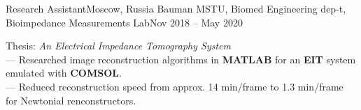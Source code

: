 \resumeSubheading
{Research Assistant}{Moscow, Russia}
{Bauman MSTU, Biomed Engineering dep-t, Bioimpedance Measurements Lab}{Nov 2018 -- May 2020}
\begin{itemize}[leftmargin=0in, label={}]
    \small{\item{
        {Thesis: \textit{An Electrical Impedance Tomography System}}\\
        {— Researched image reconstruction algorithms in \textbf{MATLAB} for an \textbf{EIT} system emulated with \textbf{COMSOL}.}\\
        {— Reduced reconstruction speed from approx. 14 min/frame to 1.3 min/frame for Newtonial renconstructors.}\\
    }}
\end{itemize}